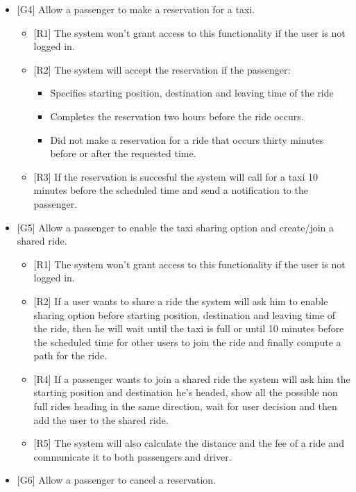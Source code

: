\begin{itemize}
\begin{itemize}
\begin{itemize}
		\end{itemize}
	\end{itemize}
		\item {[G4]} Allow a passenger to make a reservation for a taxi.
			\begin{itemize}
				\item {[R1]} The system won't grant access to this functionality if the user is not logged in.
				\item {[R2]} The system will accept the reservation if the passenger: 
				\begin{itemize}
					\item Specifies starting position, destination and leaving time of the ride
					\item Completes the reservation two hours before the ride occurs.
					\item Did not make a reservation for a ride that occurs thirty minutes before or after the requested time.					
				\end{itemize}
				\item {[R3]} If the reservation is succesful the system will call for a taxi 10 minutes before the scheduled time and send a notification to the passenger.
			\end{itemize}
		\item {[G5]} Allow a passenger to enable the taxi sharing option and create/join a shared ride.
			\begin{itemize}
				\item {[R1]} The system won't grant access to this functionality if the user is not logged in.
				\item {[R2]} If a user wants to share a ride the system will ask him to enable sharing option before starting position, destination and leaving time of the ride, then he will wait until the taxi is full or until 10 minutes before the scheduled time for other users to join the ride and finally compute a path for the ride.
				\item {[R4]} If a passenger wants to join a shared ride the system will ask him the starting position and destination he's headed, show all the possible non full rides heading in the same direction, wait for user decision and then add the user to the shared ride.
				\item {[R5]} The system will also calculate the distance and the fee of a ride and communicate it to both passengers and driver.
			\end{itemize}
		\item {[G6]} Allow a passenger to cancel a reservation.

\end{itemize}
